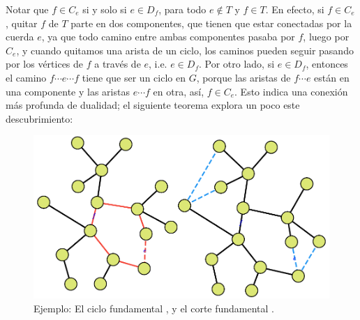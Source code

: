 \documentclass[../main.tex]{subfiles}
\begin{document}
Notar que $f \in C_e$ si y solo si $e \in D_f$, para todo $e \not \in T$ y $f \in T$. En efecto, si $f \in C_e$, quitar $f$ de $T$ parte en dos componentes, que tienen que estar conectadas por la cuerda $e$, ya que todo camino entre ambas componentes pasaba por $f$, luego por $C_e$, y cuando quitamos una arista de un ciclo, los caminos pueden seguir pasando por los vértices de $f$ a través de $e$, i.e. $e \in D_f$. Por otro lado, si $e \in D_f$, entonces el camino $f \cdots e \cdots f$ tiene que ser un ciclo en $G$, porque las aristas de $f \cdots e$ están en una componente y las aristas $e \cdots f$ en otra, así, $f \in C_e$. Esto indica una conexión más profunda de dualidad; el siguiente teorema explora un poco este descubrimiento:

\begin{figure}
\includegraphics[width=\linewidth]{"./Apendice/Figuras/Capitulo 1/Dibujo 1.pdf"}
\caption{Ejemplo: El ciclo fundamental , y el corte fundamental .}
\end{figure}
\end{document}
